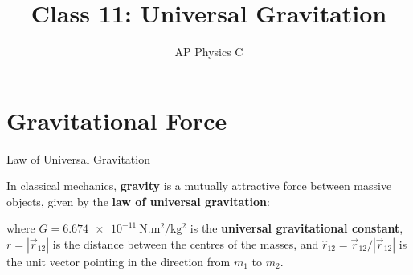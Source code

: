 \documentclass[12pt,compress,aspectratio=169]{beamer}
\title{Class 11: Universal Gravitation}
\subtitle{AP Physics C}
\begin{document}
\begin{frame}
  \maketitle
\end{frame}


\section{Gravitational Force}

\begin{frame}{Law of Universal Gravitation}
  \begin{center}
  \end{center}

  In classical mechanics, \textbf{gravity} is a mutually attractive force
  between massive objects, given by the \textbf{law of universal gravitation}:


  where $G=\SI{6.674e-11}{\newton.\metre\squared\per\kilo\gram\squared}$ is the
  \textbf{universal gravitational constant}, $r=|\vec r_{12}|$ is the distance
  between the centres of the masses, and $\hat r_{12}=\vec r_{12}/|\vec r_{12}|$
  is the unit vector pointing in the direction from $m_1$ to $m_2$.
\end{frame}
\end{document}
